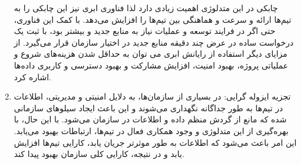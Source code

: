 \begin{enumerate}
چابکی در این متدلوژی اهمیت زیادی دارد لذا فناوری ابری نیز این چابکی را به تیم‌ها ارائه و سرعت و هماهنگی بین تیم‌ها را افزایش می‌دهد. با کمک این فناوری، حتی اگر در فرایند توسعه و عملیات نیاز به منابع جدید و بیشتر بود، با ثبت یک درخواست ساده در عرض چند دقیقه منابع جدید در اختیار سازمان قرار می‌گیرد. از مزایای دیگر استفاده از رایانش ابری می توان به حداقل شدن هزینه‌های شروع و عملیاتی پروژه، بهبود امنیت، افزایش مشارکت و بهبود دسترسی و کاربری داده‌ها اشاره کرد.
	\item
تجزیه ایزوله گرایی: در بسیاری از سازمان‌ها، به دلایل امنیتی و مدیریتی، اطلاعات در تیم‌ها به طور جداگانه نگهداری می‌شوند و این باعث ایجاد سیلوهای سازمانی شده که مانع از گردش منظم داده و اطلاعات در سازمان می‌شود.
با این حال، با بهره‌گیری از این متدلوژی و وجود همکاری فعال در تیم‌ها، ارتباطات بهبود می‌یابد. این امر باعث می‌شود که اطلاعات به طور موثرتر جریان یابد، کارایی تیم‌ها افزایش یابد و در نتیجه، کارایی کلی سازمان بهبود پیدا کند.
\end{enumerate}
